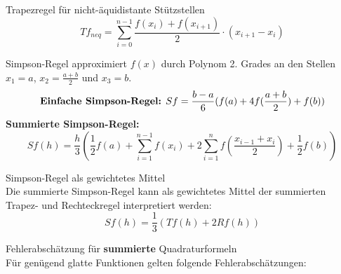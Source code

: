 \begin{corollary}{Trapezregel für nicht-äquidistante Stützstellen}
$$Tf_{neq} = \sum_{i=0}^{n-1} \frac{f(x_i) + f(x_{i+1})}{2} \cdot (x_{i+1} - x_i)$$
\end{corollary}

\raggedcolumns

\begin{definition}{Simpson-Regel}
approximiert $f(x)$ durch Polynom 2. Grades an den Stellen $x_1 = a$, $x_2 = \frac{a+b}{2}$ und $x_3 = b$.
\vspace{-2mm}\\
$$\text{\textbf{Einfache Simpson-Regel:} } Sf = \frac{b-a}{6} (f(a) + 4f(\frac{a+b}{2}) + f(b))$$
\textbf{Summierte Simpson-Regel:}
\vspace{-2mm}\\
$$Sf(h) = \frac{h}{3} (\frac{1}{2}f(a) + \sum_{i=1}^{n-1} f(x_i) + 2\sum_{i=1}^{n} f(\frac{x_{i-1} + x_i}{2}) + \frac{1}{2}f(b))$$
\end{definition}

\begin{concept}{Simpson-Regel als gewichtetes Mittel}\\
Die summierte Simpson-Regel kann als gewichtetes Mittel der summierten Trapez- und Rechteckregel interpretiert werden:
$$Sf(h) = \frac{1}{3}(Tf(h) + 2Rf(h))$$
\end{concept}

\begin{theorem}{Fehlerabschätzung} für \textbf{summierte} Quadraturformeln\\
Für genügend glatte Funktionen gelten folgende Fehlerabschätzungen:
\vspace{1mm}\\
\vspace{1mm}\\
\vspace{1mm}\\
\end{theorem}

